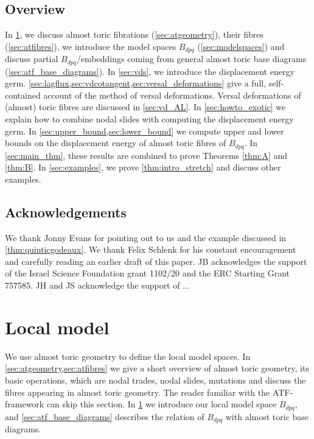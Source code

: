 \documentclass[12pt,a4paper,abstract=true,final]{scrartcl}
\begin{document}
\subsection{Overview}

In \cref{sec:local_model}, we discuss almost toric fibrations (\cref{sec:atgeometry}), their fibres (\cref{sec:atfibres}), we introduce the model spaces $B_{dpq}$ (\cref{sec:modelspaces}) and discuss partial $B_{dpq}$\-/embeddings coming from general almost toric base diagrams (\cref{sec:atf_base_diagrams}).
In \cref{sec:vds}, we introduce the displacement energy germ.
\cref{sec:lagflux,sec:vdcotangent,sec:versal_deformations} give a full, self-contained account of the method of versal deformations.
Versal deformations of (almost) toric fibres are discussed in \cref{sec:vd_AL}. In \cref{sec:howto_exotic} we explain how to combine nodal slides with computing the displacement energy germ.
In \cref{sec:upper_bound,sec:lower_bound} we compute upper and lower bounds on the displacement energy of almost toric fibres of $B_{dpq}$.
In \cref{sec:main_thm}, these results are combined to prove Theorems \ref{thm:A} and \ref{thm:B}.
In \cref{sec:examples}, we prove \cref{thm:intro_stretch} and discuss other examples.

\subsection{Acknowledgements}
We thank Jonny Evans for pointing out to us \cite{EvaUrz21} and the example discussed in \cref{thm:quinticgodeaux}.
We thank Felix Schlenk for his constant encouragement and carefully reading an earlier draft of this paper.
JB acknowledges the support of the Israel Science Foundation grant 1102/20 and the ERC Starting Grant 757585.
JH and JS acknowledge the support of ... 


\section{Local model}
\label{sec:local_model}

We use almost toric geometry to define the local model spaces.
In \cref{sec:atgeometry,sec:atfibres} we give a short overview of almost toric geometry, its basic operations, which are nodal trades, nodal slides, mutations and discuss the fibres appearing in almost toric geometry.
The reader familiar with the ATF-framework can skip this section.
In \cref{sec:local_model} we introduce our local model space $B_{dpq}$, and \cref{sec:atf_base_diagrams} describes the relation of $B_{dpq}$ with almost toric base diagrams.
\end{document}
